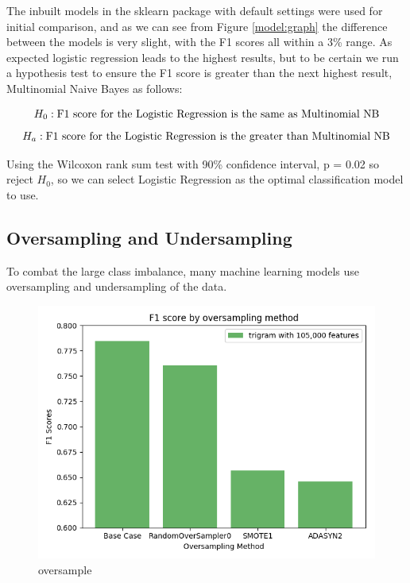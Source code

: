 The inbuilt models in the sklearn package with default settings were used for initial comparison, and as we can see from Figure \ref{model:graph} the difference between the models is very slight, with the F1 scores all within a 3\% range. As expected logistic regression leads to the highest results, but to be certain we run a hypothesis test to ensure the F1 score is greater than the next highest result, Multinomial Naive Bayes as follows:

$$ H_0: \textnormal{F1 score for the Logistic Regression is the same as Multinomial NB}$$
$$ H_a: \textnormal{F1 score for the Logistic Regression is the greater than Multinomial NB}$$

Using the Wilcoxon rank sum test with 90\% confidence interval, p = 0.02 so reject $H_0$, so we can select Logistic Regression as the optimal classification model to use.


\subsection{Oversampling and Undersampling}

To combat the large class imbalance, many machine learning models use oversampling and undersampling of the data. 




\begin{figure}[h]
\caption{oversample}
\centering
\includegraphics[scale=0.6]{graphs/oversampling.png}
\end{figure}

